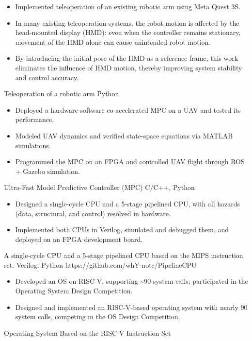 \documentclass[]{awesome-cv}
\begin{document}
\begin{cventries}
	\cventry
	{\begin{itemize}[leftmargin=*]
		\item Implemented teleoperation of an existing robotic arm using Meta Quest 3S.
		\item In many existing teleoperation systems, the robot motion is affected by the head-mounted display (HMD): even when the controller remains stationary, movement of the HMD alone can cause unintended robot motion. 
		\item By introducing the initial pose of the HMD as a reference frame, this work eliminates the influence of HMD motion, thereby improving system stability and control accuracy.
	\end{itemize}
	}
	{Teleoperation of a robotic arm}
	{Python}
	{}
	{}
	
	\vspace{-7mm}
	\cventry
	{\begin{itemize}[leftmargin=*]
		\item Deployed a hardware-software co-accelerated MPC on a UAV and tested its performance. 
		\item Modeled UAV dynamics and verified state-space equations via MATLAB simulations. 
		\item Programmed the MPC on an FPGA and controlled UAV flight through ROS + Gazebo simulation.
	\end{itemize}
	}
	{Ultra-Fast Model Predictive Controller (MPC)}
	{C/C++, Python}
	{}
	{}
	
	\vspace{-7mm}
	\cventry
	{\begin{itemize}[leftmargin=*]
		\item Designed a single-cycle CPU and a 5-stage pipelined CPU, with all hazards (data, structural, and control) resolved in hardware. 
		\item Implemented both CPUs in Verilog, simulated and debugged them, and deployed on an FPGA development board.
	\end{itemize}
	}
	{A single-cycle CPU and a 5-stage pipelined CPU based on the MIPS instruction set.}
	{Verilog, Python}
	{https://github.com/whY-note/PipelineCPU}
	{}
	
	\vspace{-7mm}
	\cventry
	{
	\begin{itemize}[leftmargin=*]
		\item Developed an OS on RISC-V, supporting \textasciitilde{}90 system calls; participated in the Operating System Design Competition.
		\item Designed and implemented an RISC-V-based operating system with nearly 90 system calls, competing in the OS Design Competition.
	\end{itemize}
	}
	{Operating System Based on the RISC-V Instruction Set}
	{}
	{}
	{}
	
	\vspace{-5mm}
\end{cventries}
\end{document}

